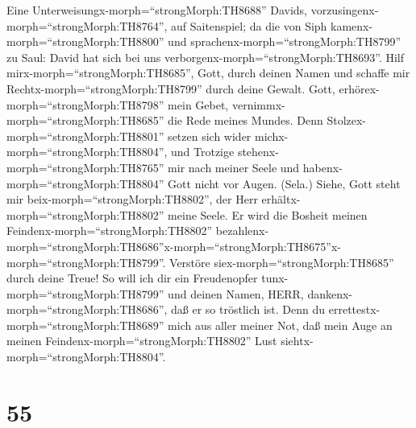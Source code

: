  Eine Unterweisungx-morph=``strongMorph:TH8688'' Davids,
vorzusingenx-morph=``strongMorph:TH8764'', auf Saitenspiel; da die von
Siph kamenx-morph=``strongMorph:TH8800'' und
sprachenx-morph=``strongMorph:TH8799'' zu Saul: David hat sich bei uns
verborgenx-morph=``strongMorph:TH8693''. Hilf
mirx-morph=``strongMorph:TH8685'', Gott, durch deinen Namen und schaffe
mir Rechtx-morph=``strongMorph:TH8799'' durch deine Gewalt. 
Gott, erhörex-morph=``strongMorph:TH8798'' mein Gebet,
vernimmx-morph=``strongMorph:TH8685'' die Rede meines Mundes.
 Denn Stolzex-morph=``strongMorph:TH8801'' setzen sich wider
michx-morph=``strongMorph:TH8804'', und Trotzige
stehenx-morph=``strongMorph:TH8765'' mir nach meiner Seele und
habenx-morph=``strongMorph:TH8804'' Gott nicht vor Augen. (Sela.)
 Siehe, Gott steht mir beix-morph=``strongMorph:TH8802'',
der Herr erhältx-morph=``strongMorph:TH8802'' meine Seele. 
Er wird die Bosheit meinen Feindenx-morph=``strongMorph:TH8802''
bezahlenx-morph=``strongMorph:TH8686''\textbar x-morph=``strongMorph:TH8675''x-morph=``strongMorph:TH8799''.
Verstöre siex-morph=``strongMorph:TH8685'' durch deine Treue!
 So will ich dir ein Freudenopfer
tunx-morph=``strongMorph:TH8799'' und deinen Namen, HERR,
dankenx-morph=``strongMorph:TH8686'', daß er so tröstlich ist.
 Denn du errettestx-morph=``strongMorph:TH8689'' mich aus
aller meiner Not, daß mein Auge an meinen
Feindenx-morph=``strongMorph:TH8802'' Lust
siehtx-morph=``strongMorph:TH8804''.

\hypertarget{section-54}{%
\section{55}\label{section-54}}

